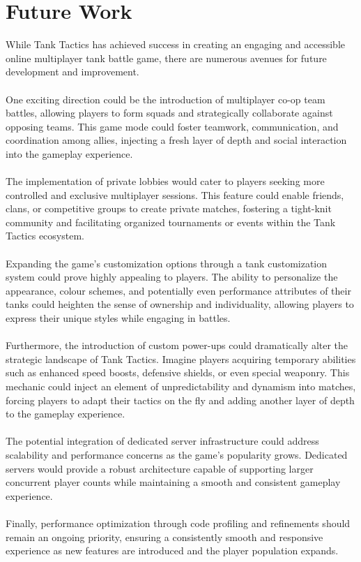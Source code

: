 \section{Future Work}
While Tank Tactics has achieved success in creating an engaging and accessible online multiplayer tank battle game, there are numerous avenues for future development and improvement.
\\
\noindent
\\
One exciting direction could be the introduction of multiplayer co-op team battles, allowing players to form squads and strategically collaborate against opposing teams. This game mode could foster teamwork, communication, and coordination among allies, injecting a fresh layer of depth and social interaction into the gameplay experience.
\\
\noindent
\\
The implementation of private lobbies would cater to players seeking more controlled and exclusive multiplayer sessions. This feature could enable friends, clans, or competitive groups to create private matches, fostering a tight-knit community and facilitating organized tournaments or events within the Tank Tactics ecosystem.
\\
\noindent
\\
Expanding the game's customization options through a tank customization system could prove highly appealing to players. The ability to personalize the appearance, colour schemes, and potentially even performance attributes of their tanks could heighten the sense of ownership and individuality, allowing players to express their unique styles while engaging in battles.
\\
\noindent
\\
Furthermore, the introduction of custom power-ups could dramatically alter the strategic landscape of Tank Tactics. Imagine players acquiring temporary abilities such as enhanced speed boosts, defensive shields, or even special weaponry. This mechanic could inject an element of unpredictability and dynamism into matches, forcing players to adapt their tactics on the fly and adding another layer of depth to the gameplay experience.
\\
\noindent
\\
The potential integration of dedicated server infrastructure could address scalability and performance concerns as the game's popularity grows. Dedicated servers would provide a robust architecture capable of supporting larger concurrent player counts while maintaining a smooth and consistent gameplay experience.
\\
\noindent
\\
Finally, performance optimization through code profiling and refinements should remain an ongoing priority, ensuring a consistently smooth and responsive experience as new features are introduced and the player population expands.